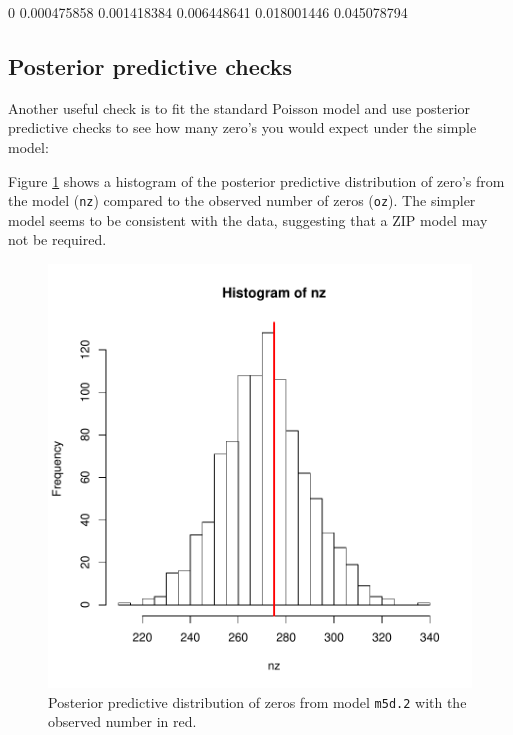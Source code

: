 \documentclass{article}
\begin{document}
\begin{Schunk}
\begin{Soutput}
         0%
0.000475858 0.001418384 0.006448641 0.018001446 0.045078794 
\end{Soutput}
\end{Schunk}

\subsection{Posterior predictive checks}

Another useful check is to fit the standard Poisson model and use posterior predictive checks to see how many zero's you would expect under the simple model:

\begin{Schunk}
\end{Schunk}

Figure \ref{PPZIP}  shows a histogram of the posterior predictive distribution of zero's from the model (\texttt{nz}) compared to the observed number of zeros (\texttt{oz}). The simpler model seems to be consistent with the data, suggesting that a ZIP model may not be required.


\begin{figure}[!h]
\begin{center}
\includegraphics{Lecture5-043}
\end{center}
\caption{Posterior predictive distribution of zeros from model \texttt{m5d.2} with the observed number in red.}
\label{PPZIP}
\end{figure}


\ifalone


\end{document}
